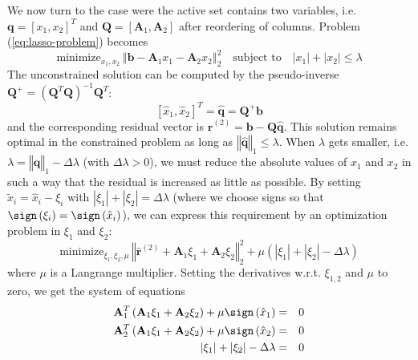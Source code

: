 We now turn to the case were the active set contains two variables,
i.e. $\mathbf{q}=\left[x_{1},x_{2}\right]^{T}$ and $\mathbf{Q}=\left[\mathbf{A}_{1},\mathbf{A}_{2}\right]$
after reordering of columns. Problem (\ref{eq:lasso-problem}) becomes
\begin{equation}
\textrm{minimize}_{x_{1},x_{2}}\,\left\Vert \mathbf{b}-\mathbf{A}_{1}x_{1}-\mathbf{A}_{2}x_{2}\right\Vert _{2}^{2}\quad\textrm{subject to}\quad\left|x_{1}\right|+\left|x_{2}\right|\le\lambda
\end{equation}
The unconstrained solution can be computed by the pseudo-inverse $\mathbf{Q}^{+}=\left(\mathbf{Q}^{T}\mathbf{Q}\right)^{-1}\mathbf{Q}^{T}$:
\begin{equation}
\left[\hat{x}_{1},\hat{x}_{2}\right]^{T}=\hat{\mathbf{q}}=\mathbf{Q}^{+}\mathbf{b}
\end{equation}
and the corresponding residual vector is $\hat{\mathbf{r}}^{(2)}=\mathbf{b}-\mathbf{Q}\mathbf{\hat{q}}$.
This solution remains optimal in the constrained problem as long as
$\left\Vert \mathbf{\hat{q}}\right\Vert _{1}\le\lambda$. When $\lambda$
gets smaller, i.e. $\lambda=\left\Vert \mathbf{\hat{q}}\right\Vert _{1}-\Delta\lambda$
(with $\Delta\lambda>0$), we must reduce the absolute values of $x_{1}$
and $x_{2}$ in such a way that the residual is increased as little
as possible. By setting $\tilde{x}_{i}=\hat{x}_{i}-\xi_{i}$ with
$\left|\xi_{1}\right|+\left|\xi_{2}\right|=\Delta\lambda$ (where
we choose signs so that $\sign\left(\xi_{i}\right)=\sign\left(\hat{x}_{i}\right)$),
we can express this requirement by an optimization problem in $\xi_{1}$
and $\xi_{2}$:
\begin{equation}
\textrm{minimize}_{\xi_{1},\xi_{2},\mu}\,\left\Vert \hat{\mathbf{r}}^{(2)}+\mathbf{A}_{1}\xi_{1}+\mathbf{A}_{2}\xi_{2}\right\Vert _{2}^{2}+\mu\left(\left|\xi_{1}\right|+\left|\xi_{2}\right|-\Delta\lambda\right)
\end{equation}
where $\mu$ is a Langrange multiplier. Setting the derivatives w.r.t.
$\xi_{1,2}$ and $\mu$ to zero, we get the system of equations
\begin{eqnarray}
\mathbf{A}_{1}^{T}\left(\mathbf{A}_{1}\xi_{1}+\mathbf{A}_{2}\xi_{2}\right)+\mu\sign\left(\hat{x}_{1}\right) & = & 0\nonumber \\
\mathbf{A}_{2}^{T}\left(\mathbf{A}_{1}\xi_{1}+\mathbf{A}_{2}\xi_{2}\right)+\mu\sign\left(\hat{x}_{2}\right) & = & 0\label{eq:sytem-A2}\\
\left|\xi_{1}\right|+\left|\xi_{2}\right|-\Delta\lambda & = & 0\nonumber 
\end{eqnarray}
